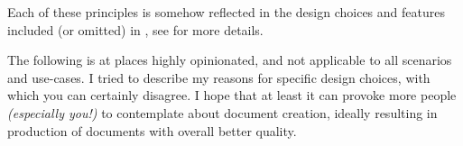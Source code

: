 Each of these principles is somehow reflected in the design choices and features included (or omitted) in \TeXtured{}, see  for more details.

\begin{remark}[Disclaimer]
    The following is at places highly opinionated, and not applicable to all
    scenarios and use-cases.
    I tried to describe my reasons for specific design choices, with which you can certainly disagree.
    I hope that at least it can provoke more people \emph{(especially you!)} to contemplate about document creation, ideally resulting in production of documents with overall better quality.
\end{remark}

